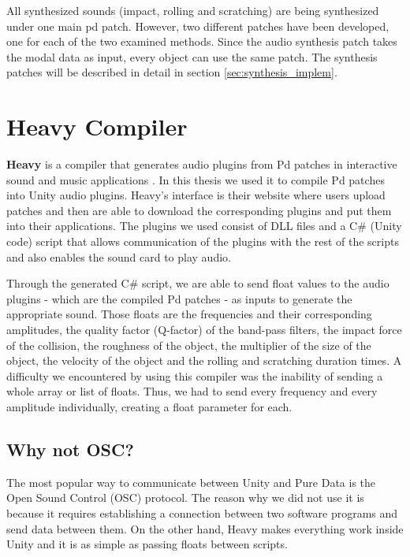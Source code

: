 All synthesized sounds (impact, rolling and scratching) are being synthesized under one main pd patch. However, two different patches have been developed, one for each of the two examined methods. Since the audio synthesis patch takes the modal data as input, every object can use the same patch. The synthesis patches will be described in detail in section \ref{sec:synthesis_implem}.



\section{Heavy Compiler}\label{sec:heavy}
\textbf{Heavy} is a compiler that generates audio plugins from Pd patches in interactive sound and music applications \cite{bib:heavy}. In this thesis we used it to compile Pd patches into Unity\textsuperscript{\textregistered} audio plugins. Heavy's interface is their website where users upload patches and then are able to download the corresponding plugins and put them into their applications. The plugins we used consist of DLL files and a C\# (Unity\textsuperscript{\textregistered} code) script that allows communication of the plugins with the rest of the scripts and also enables the sound card to play audio.

Through the generated C\# script, we are able to send float values to the audio plugins - which are the compiled Pd patches - as inputs to generate the appropriate sound. Those floats are the frequencies and their corresponding amplitudes, the quality factor (Q-factor) of the band-pass filters, the impact force of the collision, the roughness of the object, the multiplier of the size of the object, the velocity of the object and the rolling and scratching duration times. A difficulty we encountered by using this compiler was the inability of sending a whole array or list of floats. Thus, we had to send every frequency and every amplitude individually, creating a float parameter for each.
 
\subsection{Why not OSC?}
The most popular way to communicate between Unity\textsuperscript{\textregistered} and Pure Data is the Open Sound Control (OSC) protocol. The reason why we did not use it is because it requires establishing a connection between two software programs and send data between them. On the other hand, Heavy makes everything work inside Unity\textsuperscript{\textregistered} and it is as simple as passing floats between scripts. 

